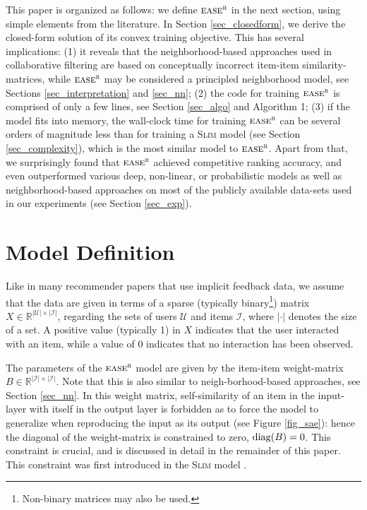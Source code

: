 \documentclass[sigconf]{acmart}
\newcommand{\slim}{{\scshape Slim}}
\newcommand{\sae}{${\textsc{ease}}^{\textsc{r}}$}
\newcommand{\W}{B}
\newcommand{\X}{X}
\newcommand{\RR}{\mathbb{R}}
\newcommand{\I}{\mathcal{ I}}
\newcommand{\UU}{\mathcal{U}}
\newcommand{\diag}{{\rm diag}}
\begin{document}
This paper is organized as follows: we define \sae{}  in the next section, using simple elements from the literature. In Section \ref{sec_closedform}, we derive the closed-form solution of its convex training objective. This has several implications:  (1) it reveals that the neighborhood-based approaches used in collaborative filtering are based on conceptually incorrect item-item similarity-matrices, while \sae{}  may be considered  a principled neighborhood model, see Sections \ref{sec_interpretation} and \ref{sec_nn};
(2) the code for training \sae{}  is comprised of only a few lines, see Section \ref{sec_algo} and Algorithm 1; (3) if the model fits into memory, the wall-clock time for training \sae{}  can be   several  orders of magnitude less than  for training a \slim{}  \cite{ning11} model (see Section \ref{sec_complexity}), which is the most similar model to \sae{}.
Apart from that, we surprisingly found that \sae{}   achieved competitive ranking accuracy, and even outperformed  various deep, non-linear, or probabilistic models as well as neighborhood-based approaches on most of the publicly available data-sets used in our experiments (see Section \ref{sec_exp}).



\section{Model Definition}
Like in many recommender papers that use implicit feedback data,
we assume that the  data are given in terms of a sparse (typically binary\footnote{Non-binary matrices may also be used.})  matrix $\X \in \RR^{|\UU|\times|\I|}$, regarding the sets of users $\UU$ and items $\I$, where $|\cdot|$ denotes the size of a set. A positive value (typically 1) in $\X$ indicates that the user interacted with an item, while a value of 0 indicates that no interaction has been observed.

The parameters of the \sae{}  model are given by the item-item  weight-matrix $\W \in \RR^{|\I|\times|\I|}$. Note that this is also similar to neigh-borhood-based approaches, see Section \ref{sec_nn}. In this weight matrix, self-similarity of an item in the input-layer with itself in the output layer is forbidden as to force the model to generalize when reproducing  the input as its output (see Figure \ref{fig_sae}): 
hence   the  diagonal of the weight-matrix is constrained to zero, $\diag(\W)=0$. This constraint is crucial, and is discussed in detail in the remainder of this paper. This constraint was first introduced in the \slim{} model  \cite{ning11}.
\end{document}
